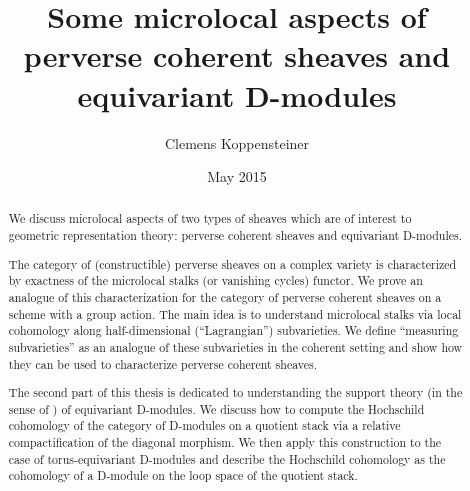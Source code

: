 \documentclass[english]{thesis}
\title{Some microlocal aspects of perverse coherent sheaves and equivariant D-modules}
\author{Clemens Koppensteiner}
\date{May 2015}
\begin{document}
\frontmatter

\maketitlepage

\begin{abstract}
    We discuss microlocal aspects of two types of sheaves which are of interest to geometric representation theory: perverse coherent sheaves and equivariant D-modules.

    The category of (constructible) perverse sheaves on a complex variety is characterized by exactness of the microlocal stalks (or vanishing cycles) functor.
    We prove an analogue of this characterization for the category of perverse coherent sheaves on a scheme with a group action.
    The main idea is to understand microlocal stalks via local cohomology along half-dimensional (\enquote{Lagrangian}) subvarieties.
    We define \enquote{measuring subvarieties} as an analogue of these subvarieties in the coherent setting and show how they can be used to characterize perverse coherent sheaves.

    The second part of this thesis is dedicated to understanding the support theory (in the sense of \cite{BensonIyengarKrause:2008:LocalCohomologyAndSupportForTriangulatedCategories}) of equivariant D-modules.
    We discuss how to compute the Hochschild cohomology of the category of D-modules on a quotient stack via a relative compactification of the diagonal morphism.
    We then apply this construction to the case of torus-equivariant D-modules and describe the Hochschild cohomology as the cohomology of a D-module on the loop space of the quotient stack.
\end{abstract}



\tableofcontents

\mainmatter





\backmatter

\printbibliography
\end{document}
